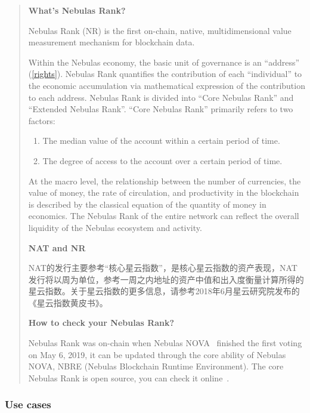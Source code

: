 \begin{quote}
	\textbf{What's Nebulas Rank?}
		
	Nebulas Rank (NR) is the first on-chain, native, multidimensional value measurement mechanism for blockchain data.

	Within the Nebulas economy, the basic unit of governance is an “address” (\ref{rights}). Nebulas Rank quantifies the contribution of each “individual” to the economic accumulation via mathematical expression of the contribution to each address. Nebulas Rank is divided into “Core Nebulas Rank” and “Extended Nebulas Rank”. “Core Nebulas Rank” primarily refers to two factors:

	\begin{enumerate}
		\item The median value of the account within a certain period of time.
		\item The degree of access to the account over a certain period of time.
	\end{enumerate}

	At the macro level, the relationship between the number of currencies, the value of money, the rate of circulation, and productivity in the blockchain is described by the classical equation of the quantity of money in economics. The Nebulas Rank of the entire network can reflect the overall liquidity of the Nebulas ecosystem and activity.

	\vspace{2em}

	\textbf{NAT and NR}

	NAT的发行主要参考“核心星云指数”，是核心星云指数的资产表现，NAT发行将以周为单位，参考一周之内地址的资产中值和出入度衡量计算所得的星云指数。关于星云指数的更多信息，请参考2018年6月星云研究院发布的《星云指数黄皮书》。

	\vspace{2em}

	\textbf{How to check your Nebulas Rank?}

	Nebulas Rank was on-chain when Nebulas NOVA~\cite{nova} finished the first voting on May 6, 2019, it can be updated through the core ability of Nebulas NOVA, NBRE (Nebulas Blockchain Runtime Environment). The core Nebulas Rank is open source, you can check it online~\cite{CheckNR}.

\end{quote}

\subsubsection{Use cases}

